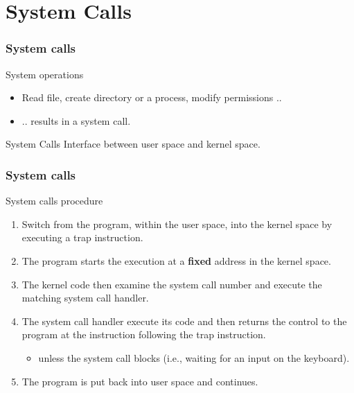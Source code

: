 \section{System Calls}
\begin{frame}
  \frametitle{System calls}
  \begin{block}{System operations}
    \begin{itemize}
      \item Read file, create directory or a process, modify permissions ..
      \item .. results in a system call.
    \end{itemize}
  \end{block}
  \begin{block}{System Calls}
      Interface between user space and kernel space.
  \end{block}
\end{frame}

\begin{frame}
  \frametitle{System calls}
  \begin{block}{System calls procedure}
    \begin{enumerate}
      \item Switch from the program, within the user space, into the kernel space by executing a trap instruction.
      \item The program starts the execution at a \textbf{fixed} address in the kernel space.
      \item The kernel code then examine the system call number and execute the matching system call handler.
      \item The system call handler execute its code and then returns the control to the program at the instruction following the trap instruction.
        \begin{itemize}
          \item unless the system call blocks (i.e., waiting for an input on the keyboard).
        \end{itemize}
      \item The program is put back into user space and continues.
    \end{enumerate}
  \end{block}
\end{frame}

